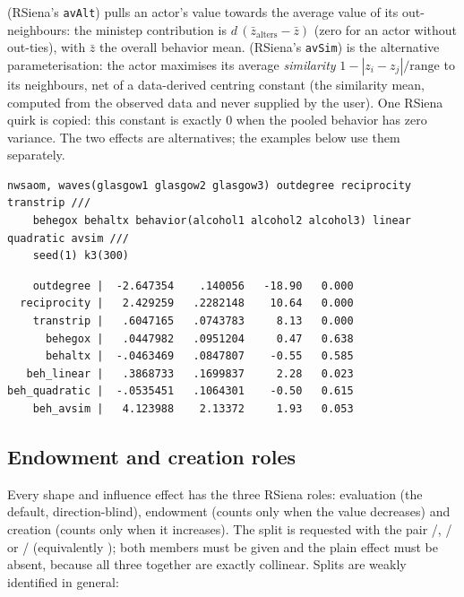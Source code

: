  (RSiena's \texttt{avAlt}) pulls an actor's value towards the average value of its out-neighbours: the ministep contribution is $d\,(\bar z_{\mathrm{alters}} - \bar z)$ (zero for an actor without out-ties), with $\bar z$ the overall behavior mean.  (RSiena's \texttt{avSim}) is the alternative parameterisation: the actor maximises its average \emph{similarity} $1 - |z_i - z_j|/\text{range}$ to its neighbours, net of a data-derived centring constant (the similarity mean, computed from the observed data and never supplied by the user). One RSiena quirk is copied: this constant is exactly 0 when the pooled behavior has zero variance. The two effects are alternatives; the examples below use them separately.

\begin{lstlisting}
nwsaom, waves(glasgow1 glasgow2 glasgow3) outdegree reciprocity transtrip ///
    behegox behaltx behavior(alcohol1 alcohol2 alcohol3) linear quadratic avsim ///
    seed(1) k3(300)
\end{lstlisting}
\begin{lstlisting}
    outdegree |  -2.647354    .140056   -18.90   0.000
  reciprocity |   2.429259   .2282148    10.64   0.000
    transtrip |   .6047165   .0743783     8.13   0.000
      behegox |   .0447982   .0951204     0.47   0.638
      behaltx |  -.0463469   .0847807    -0.55   0.585
   beh_linear |   .3868733   .1699837     2.28   0.023
beh_quadratic |  -.0535451   .1064301    -0.50   0.615
    beh_avsim |   4.123988    2.13372     1.93   0.053
\end{lstlisting}

\subsection{Endowment and creation roles}

Every shape and influence effect has the three RSiena roles: evaluation (the default, direction-blind), endowment (counts only when the value decreases) and creation (counts only when it increases). The split is requested with the pair /, / or / (equivalently ); both members must be given and the plain effect must be absent, because all three together are exactly collinear. Splits are weakly identified in general:

